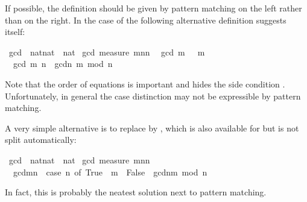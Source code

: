 \begin{isabellebody}
\begin{isamarkuptext}
If possible, the definition should be given by pattern matching on the left
rather than  on the right. In the case of  the
following alternative definition suggests itself:%
\end{isamarkuptext}%
\ gcd\ {\isacharcolon}{\isacharcolon}\ {\isachardoublequote}nat{\isacharasterisk}nat\ {\isasymRightarrow}\ nat{\isachardoublequote}\isanewline
{}\ gcd\ {\isachardoublequote}measure\ {\isacharparenleft}{\isasymlambda}{\isacharparenleft}m{\isacharcomma}n{\isacharparenright}{\isachardot}n{\isacharparenright}{\isachardoublequote}\isanewline
\ \ {\isachardoublequote}gcd\ {\isacharparenleft}m{\isacharcomma}\ \ {\isacharequal}\ m{\isachardoublequote}\isanewline
\ \ {\isachardoublequote}gcd\ {\isacharparenleft}m{\isacharcomma}\ n{\isacharparenright}\ {\isacharequal}\ gcdn{\isacharcomma}\ m\ mod\ n{\isacharparenright}{\isachardoublequote}%
\begin{isamarkuptext}%
\noindent
Note that the order of equations is important and hides the side condition
. Unfortunately, in general the case distinction
may not be expressible by pattern matching.

A very simple alternative is to replace  by , which
is also available for  but is not split automatically:%
\end{isamarkuptext}%
\ gcd\ {\isacharcolon}{\isacharcolon}\ {\isachardoublequote}nat{\isacharasterisk}nat\ {\isasymRightarrow}\ nat{\isachardoublequote}\isanewline
{}\ gcd\ {\isachardoublequote}measure\ {\isacharparenleft}{\isasymlambda}{\isacharparenleft}m{\isacharcomma}n{\isacharparenright}{\isachardot}n{\isacharparenright}{\isachardoublequote}\isanewline
\ \ {\isachardoublequote}gcdm{\isacharcomma}n{\isacharparenright}\ {\isacharequal}\ {\isacharparenleft}case\ n{\isacharequal}\ of\ True\ {\isasymRightarrow}\ m\ {\isacharbar}\ False\ {\isasymRightarrow}\ gcdn{\isacharcomma}m\ mod\ n{\isacharparenright}{\isacharparenright}{\isachardoublequote}%
\begin{isamarkuptext}%
\noindent
In fact, this is probably the neatest solution next to pattern matching.


\end{isamarkuptext}
\end{isabellebody}
